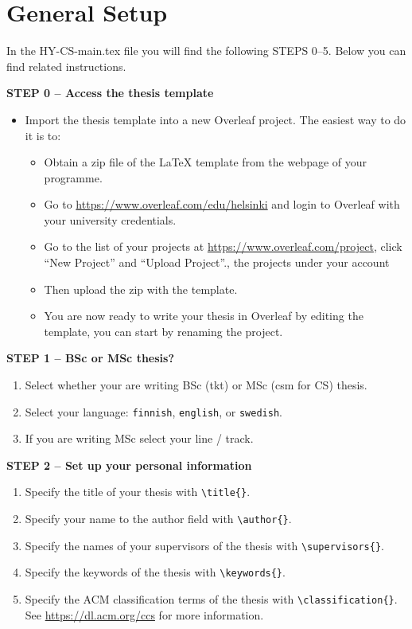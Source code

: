 

\section{General Setup}

In the HY-CS-main.tex file you will find the following STEPS 0--5. Below you can find related instructions.
\vspace{0.5cm}

\textbf{STEP 0 -- Access the thesis template}

\begin{itemize}
\item Import the thesis template into a new Overleaf project. The easiest way to do it is to:
\begin{itemize}
    \item Obtain a zip file of the LaTeX template from the webpage of your programme.
    \item Go to \url{https://www.overleaf.com/edu/helsinki} and login to Overleaf with your university credentials.
    \item Go to the list of your projects at \url{https://www.overleaf.com/project}, click ``New Project'' and ``Upload Project''.,  the projects under your account 
    \item Then upload the zip with the template.
    \item You are now ready to write your thesis in Overleaf by editing the template, you can start by renaming the project.
\end{itemize}
\end{itemize}


{\textbf{STEP 1 -- BSc or MSc thesis?}}
\begin{enumerate}
\item Select whether your are writing BSc (tkt) or MSc (csm for CS) thesis.
\item Select your language: \texttt{finnish}, \texttt{english}, or \texttt{swedish}.
\item If you are writing MSc select your line / track.
\end{enumerate}


{\textbf{STEP 2 -- Set up your personal information}}

\begin{enumerate}
\item Specify the title of your thesis with \texttt{\textbackslash title\{\}}.
\item Specify your name to the author field with \texttt{\textbackslash author\{\}}.
\item Specify the names of your supervisors of the thesis with \texttt{\textbackslash supervisors\{\}}.
\item Specify the keywords of the thesis with \texttt{\textbackslash keywords\{\}}.
\item Specify the ACM classification terms of the thesis with \texttt{\textbackslash classification\{\}}. See \url{https://dl.acm.org/ccs} for more information.
\end{enumerate}

